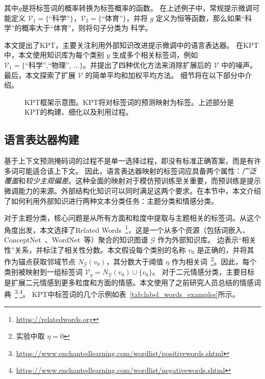 其中$g$是将标签词的概率转换为标签概率的函数。
在上述例子中，常规提示微调可能定义 $\mathcal{V}_1=\{\text{``科学''}\}$，$\mathcal{V}_2=\text{\{``体育''}\}$，并将 $g$ 定义为恒等函数，那么如果“科学”的概率大于“体育”，则将句子分类为 \textsc{科学}。

本文提出了KPT，主要关注利用外部知识改进提示微调中的语言表达器。
在KPT中，本文使用知识库为每个类别 $y$ 生成多个相关标签词，例如 $\mathcal{V}_1 = \text{\{``科学'',``物理'', ...\}}$。并提出了四种优化方法来消除扩展后的 $\mathcal{V}$ 中的噪声。最后，本文探索了扩展 $\mathcal{V}$ 的简单平均和加权平均方法。
细节将在以下部分中介绍。

\begin{figure*}[!htbp]
  \centering
{}
  \caption{KPT框架示意图。KPT将对标签词的预测映射为标签。上述部分是KPT的构建、细化以及利用过程。}
  \label{fig:my_label}
\end{figure*}


\subsection{语言表达器构建}
\label{sec:cons}

基于上下文预测掩码词的过程不是单一选择过程，即没有标准正确答案，而是有许多词可能适合该上下文。
因此，语言表达器映射的标签词应具备两个属性：\textit{广泛覆盖}和\textit{较少主观偏差}。这种全面的映射对于模仿预训练至关重要，而预训练是提示微调能力的来源。外部结构化知识可以同时满足这两个要求。在本节中，本文介绍了如何利用外部知识进行两种文本分类任务：主题分类和情感分类。

对于主题分类，核心问题是从所有方面和粒度中提取与主题相关的标签词。从这个角度出发，本文选择了Related Words~\footnote{\url{https://relatedwords.org}}，这是一个从多个资源（包括词嵌入、ConceptNet~\cite{speer2017conceptnet}、WordNet~\cite{pedersen2004wordnet}等）聚合的知识图谱 $\mathcal{G}$ 作为外部知识库。
边表示“相关性”关系，并标注了相关性分数。本文假设每个类别的名称 $v_0$ 是正确的，并将其作为锚点获取邻域节点 $N_{\mathcal{G}}(v_0)$，其分数大于阈值 $\eta$ 作为相关词~\footnote{实验中取 $\eta=0$}。因此，每个类别被映射到一组标签词 $\mathcal{V}_{y} = N_{\mathcal{G}}(v_0) \cup \{v_0\}$。
对于二元情感分类，主要目标是扩展二元情感到更多粒度和方面的情感。本文使用了之前研究人员总结的情感词典~\footnote{\url{https://www.enchantedlearning.com/wordlist/positivewords.shtml}}$^{,}$\footnote{ \url{https://www.enchantedlearning.com/wordlist/negativewords.shtml}}。
KPT中标签词的几个示例如表~\ref{tab:label_words_examples}所示。

